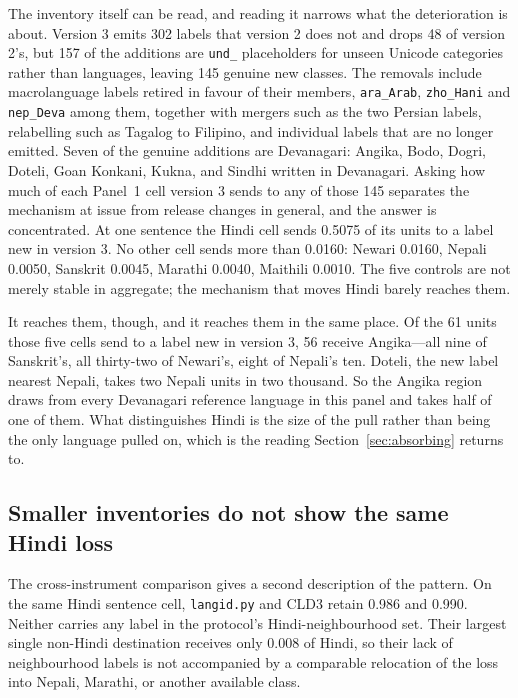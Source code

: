 \documentclass[final]{clv2025}
\newcommand{\lab}[1]{\texttt{#1}}
\begin{document}
The inventory itself can be read, and reading it narrows what the deterioration is about. Version 3 emits 302 labels that version 2 does not and drops 48 of version 2's, but 157 of the additions are \lab{und\_} placeholders for unseen Unicode categories rather than languages, leaving 145 genuine new classes. The removals include macrolanguage labels retired in favour of their members, \lab{ara\_Arab}, \lab{zho\_Hani} and \lab{nep\_Deva} among them, together with mergers such as the two Persian labels, relabelling such as Tagalog to Filipino, and individual labels that are no longer emitted. Seven of the genuine additions are Devanagari: Angika, Bodo, Dogri, Doteli, Goan Konkani, Kukna, and Sindhi written in Devanagari. Asking how much of each Panel~1 cell version 3 sends to any of those 145 separates the mechanism at issue from release changes in general, and the answer is concentrated. At one sentence the Hindi cell sends 0.5075 of its units to a label new in version 3. No other cell sends more than 0.0160: Newari 0.0160, Nepali 0.0050, Sanskrit 0.0045, Marathi 0.0040, Maithili 0.0010. The five controls are not merely stable in aggregate; the mechanism that moves Hindi barely reaches them.

It reaches them, though, and it reaches them in the same place. Of the 61 units those five cells send to a label new in version 3, 56 receive Angika---all nine of Sanskrit's, all thirty-two of Newari's, eight of Nepali's ten. Doteli, the new label nearest Nepali, takes two Nepali units in two thousand. So the Angika region draws from every Devanagari reference language in this panel and takes half of one of them. What distinguishes Hindi is the size of the pull rather than being the only language pulled on, which is the reading Section~\ref{sec:absorbing} returns to.

\subsection{Smaller inventories do not show the same Hindi loss}

The cross-instrument comparison gives a second description of the pattern. On the same Hindi sentence cell, \texttt{langid.py} and CLD3 retain 0.986 and 0.990. Neither carries any label in the protocol's Hindi-neighbourhood set. Their largest single non-Hindi destination receives only 0.008 of Hindi, so their lack of neighbourhood labels is not accompanied by a comparable relocation of the loss into Nepali, Marathi, or another available class.
\end{document}
